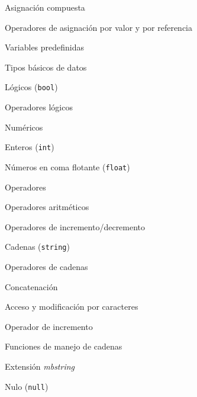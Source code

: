 \begin{longenum}
\begin{longenum}
\begin{longenum}
            \item Asignación compuesta
            \item Operadores de asignación por valor y por referencia
            \item Variables predefinidas
        \end{longenum}
        \item Tipos básicos de datos
        \begin{longenum}
            \item Lógicos (\texttt{bool})
            \begin{longenum}
                \item Operadores lógicos
            \end{longenum}
            \item Numéricos
            \begin{longenum}
                \item Enteros (\texttt{int})
                \item Números en coma flotante (\texttt{float})
                \item Operadores
                \begin{longenum}
                    \item Operadores aritméticos
                    \item Operadores de incremento/decremento
                \end{longenum}
            \end{longenum}
            \item Cadenas (\texttt{string})
            \begin{longenum}
                \item Operadores de cadenas
                \begin{longenum}
                    \item Concatenación
                    \item Acceso y modificación por caracteres
                    \item Operador de incremento \opcional\
                \end{longenum}
                \item Funciones de manejo de cadenas
                \item Extensión \textit{mbstring}
            \end{longenum}
            \item Nulo (\texttt{null})
        \end{longenum}

\end{longenum}
\end{longenum}
